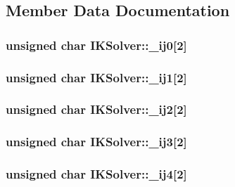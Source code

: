 \subsection{Member Data Documentation}
\hypertarget{classIKSolver_ae0fdf96e14e42d408bc5e16580c81100}{
\subsubsection[{\-\_\-ij0}]{\setlength{\rightskip}{0pt plus 5cm}unsigned char I\-K\-Solver\-::\-\_\-ij0\mbox{[}2\mbox{]}}}\label{classIKSolver_ae0fdf96e14e42d408bc5e16580c81100}
\hypertarget{classIKSolver_a66a0610cba0da00e09deda3c72e3909f}{
\subsubsection[{\-\_\-ij1}]{\setlength{\rightskip}{0pt plus 5cm}unsigned char I\-K\-Solver\-::\-\_\-ij1\mbox{[}2\mbox{]}}}\label{classIKSolver_a66a0610cba0da00e09deda3c72e3909f}
\hypertarget{classIKSolver_aff0b7815729d44c5decbef316763d45f}{
\subsubsection[{\-\_\-ij2}]{\setlength{\rightskip}{0pt plus 5cm}unsigned char I\-K\-Solver\-::\-\_\-ij2\mbox{[}2\mbox{]}}}\label{classIKSolver_aff0b7815729d44c5decbef316763d45f}
\hypertarget{classIKSolver_a4e65e7d6f429bdc4ad9146bda1b48712}{
\subsubsection[{\-\_\-ij3}]{\setlength{\rightskip}{0pt plus 5cm}unsigned char I\-K\-Solver\-::\-\_\-ij3\mbox{[}2\mbox{]}}}\label{classIKSolver_a4e65e7d6f429bdc4ad9146bda1b48712}
\hypertarget{classIKSolver_a0b552c60bc1dd705f67a32cb3f03b738}{
\subsubsection[{\-\_\-ij4}]{\setlength{\rightskip}{0pt plus 5cm}unsigned char I\-K\-Solver\-::\-\_\-ij4\mbox{[}2\mbox{]}}}\label{classIKSolver_a0b552c60bc1dd705f67a32cb3f03b738}
